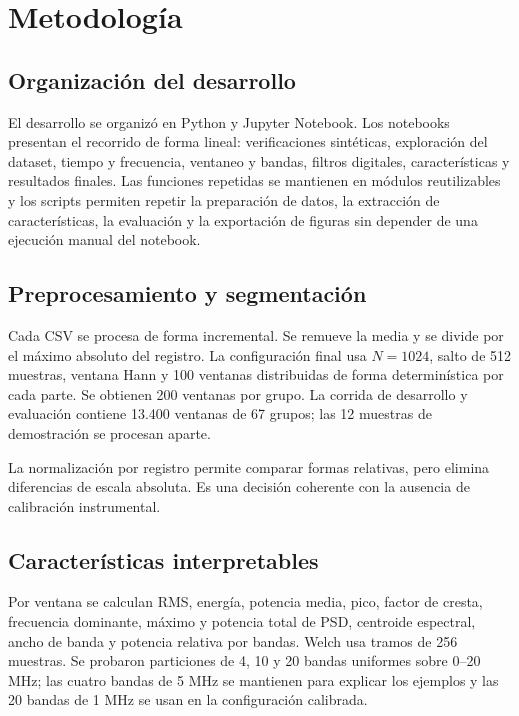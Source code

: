 \documentclass[11pt,a4paper]{article}
\begin{document}
\section{Metodología}

\subsection{Organización del desarrollo}

El desarrollo se organizó en Python y Jupyter Notebook. Los notebooks presentan el
recorrido de forma lineal: verificaciones sintéticas, exploración del dataset, tiempo y
frecuencia, ventaneo y bandas, filtros digitales, características y resultados finales.
Las funciones repetidas se mantienen en módulos reutilizables y los scripts permiten
repetir la preparación de datos, la extracción de características, la evaluación y la
exportación de figuras sin depender de una ejecución manual del notebook.

\subsection{Preprocesamiento y segmentación}

Cada CSV se procesa de forma incremental. Se remueve la media y se divide por el máximo
absoluto del registro. La configuración final usa $N=1024$, salto de 512 muestras, ventana
Hann y 100 ventanas distribuidas de forma determinística por cada parte. Se obtienen 200
ventanas por grupo. La corrida de desarrollo y evaluación contiene 13.400 ventanas de 67
grupos; las 12 muestras de demostración se procesan aparte.

La normalización por registro permite comparar formas relativas, pero elimina diferencias
de escala absoluta. Es una decisión coherente con la ausencia de calibración instrumental.

\subsection{Características interpretables}

Por ventana se calculan RMS, energía, potencia media, pico, factor de cresta, frecuencia
dominante, máximo y potencia total de PSD, centroide espectral, ancho de banda y potencia
relativa por bandas. Welch usa tramos de 256 muestras. Se probaron particiones de 4, 10 y
20 bandas uniformes sobre 0--20 MHz; las cuatro bandas de 5 MHz se mantienen para explicar
los ejemplos y las 20 bandas de 1 MHz se usan en la configuración calibrada.
\end{document}

